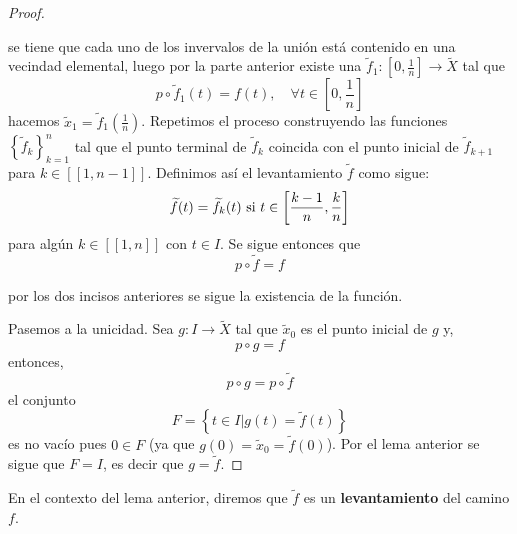 \documentclass{article}
\theoremstyle{largebreak}
\newcommand\cf[3]{\ensuremath{#1:#2\rightarrow#3}}
\newcommand\natint[1]{\ensuremath{\left[\!\left[ #1\right]\!\right]}}
\begin{document}
\begin{proof}
\begin{itemize}
            se tiene que cada uno de los invervalos de la unión está contenido en una vecindad elemental, luego por la parte anterior existe una $\cf{\widetilde{f}_1}{\left[0,\frac{1}{n} \right]}{\widetilde{X}}$ tal que
            \begin{equation*}
                p\circ\widetilde{f}_1(t)=f(t),\quad\forall t\in\left[0,\frac{1}{n} \right]
            \end{equation*}
            hacemos $\widetilde{x}_1=\widetilde{f}_1\left(\frac{1}{n}\right)$. Repetimos el proceso construyendo las funciones $\left\{\widetilde{f}_k \right\}_{ k=1}^n$ tal que el punto terminal de $\widetilde{f}_k$ coincida con el punto inicial de $\widetilde{f}_{ k+1}$ para $k\in\natint{1,n-1}$. Definimos así el levantamiento $\widetilde{f}$ como sigue:
            \begin{equation*}
                \widetilde{f}(t)=\widetilde{f}_k(t)\textup{ si }t\in\left[\frac{k-1}{n},\frac{k}{n} \right]
            \end{equation*}
            para algún $k\in\natint{1,n}$ con $t\in I$. Se sigue entonces que
            \begin{equation*}
                p\circ\widetilde{f}=f
            \end{equation*}
        \end{itemize}
        por los dos incisos anteriores se sigue la existencia de la función.

        Pasemos a la unicidad. Sea $\cf{g}{I}{\widetilde{X}}$ tal que $\widetilde{x}_0$ es el punto inicial de $g$ y,
        \begin{equation*}
            p\circ g=f
        \end{equation*}
        entonces,
        \begin{equation*}
            p\circ g=p\circ \widetilde{f}
        \end{equation*}
        el conjunto
        \begin{equation*}
            F=\left\{t\in I\Big|g(t)=\widetilde{f}(t) \right\}
        \end{equation*}
        es no vacío pues $0\in F$ (ya que $g(0)=\widetilde{x}_0=\widetilde{f}(0)$). Por el lema anterior se sigue que $F=I$, es decir que $g=\widetilde{f}$.
    \end{proof}

    \begin{mydef}
        En el contexto del lema anterior, diremos que $\widetilde{f}$ es un \textbf{levantamiento} del camino $f$.
    \end{mydef}
\end{document}
